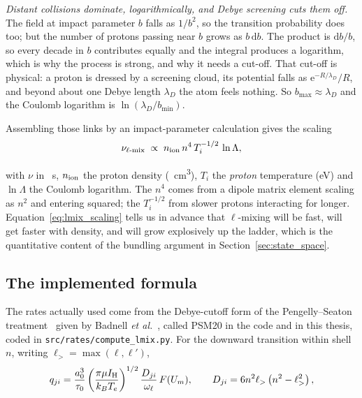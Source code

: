 \emph{Distant collisions dominate, logarithmically, and Debye screening cuts
them off.} The field at impact parameter $b$ falls as $1/b^{2}$, so the
transition probability does too; but the number of protons passing near $b$
grows as $b\,\mathrm{d}b$. The product is $\mathrm{d}b/b$, so every decade in
$b$ contributes equally and the integral produces a logarithm, which is why
the process is strong, and why it needs a cut-off. That cut-off is physical: a
proton is dressed by a screening cloud, its potential falls as
$\mathrm{e}^{-R/\lambda_D}/R$, and beyond about one Debye length $\lambda_D$ the
atom feels nothing. So $b_{\max}\approx\lambda_D$ and the Coulomb logarithm is
$\ln(\lambda_D/b_{\min})$.

Assembling those links by an impact-parameter calculation gives the scaling
\begin{equation}
  \nu_{\ell\text{-mix}} \;\propto\; n_{\mathrm{ion}}\, n^{4}\, T_i^{-1/2}\, \ln\Lambda,
  \label{eq:lmix_scaling}
\end{equation}

\noindent with $\nu$ in \si{\per\second}, $n_{\mathrm{ion}}$ the proton density
(\si{\per\cubic\centi\metre}), $T_i$ the \emph{proton} temperature
(\si{\electronvolt}) and $\ln\Lambda$ the Coulomb logarithm. The $n^{4}$ comes
from a dipole matrix element scaling as $n^{2}$ and entering squared; the
$T_i^{-1/2}$ from slower protons interacting for longer.
Equation~\eqref{eq:lmix_scaling} tells us in advance that $\ell$-mixing will be
fast, will get faster with density, and will grow explosively up the ladder,
which is the quantitative content of the bundling argument in
Section~\ref{sec:state_space}.

\subsection{The implemented formula}
\label{sec:lmix_formula}

The rates actually used come from the Debye-cutoff form of the Pengelly--Seaton
treatment~\cite{PengellySeaton1964} given by Badnell \emph{et
al.}~\cite{Badnell2021}, called PSM20 in the code and in this thesis, coded
in \texttt{src/rates/compute\_lmix.py}. For the downward transition within shell
$n$, writing $\ell_> = \max(\ell,\ell')$,
\begin{equation}
  q_{ji} = \frac{a_0^{3}}{\tau_0}
           \left(\frac{\pi\mu I_{\mathrm H}}{k_BT_e}\right)^{1/2}
           \frac{D_{ji}}{\omega_\ell}\,F(U_m),
  \qquad
  D_{ji} = 6n^{2}\ell_>\left(n^{2}-\ell_>^{2}\right),
  \label{eq:psm20}
\end{equation}


